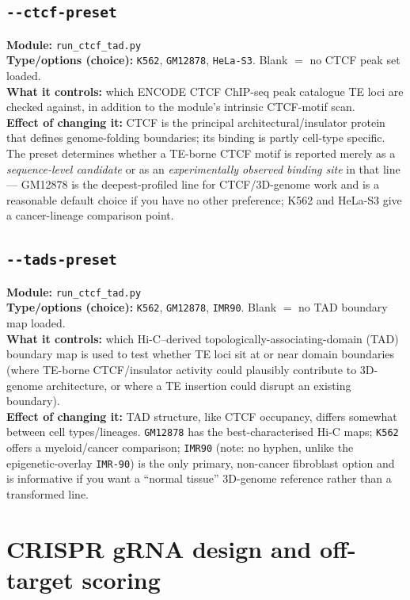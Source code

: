 \documentclass[11pt]{article}
\newcommand{\param}[1]{\subsection*{\texttt{-\/-#1}}}
\begin{document}
\param{ctcf-preset}
\textbf{Module:} \texttt{run\_ctcf\_tad.py}\\
\textbf{Type/options (choice):} \texttt{K562}, \texttt{GM12878}, \texttt{HeLa-S3}.
Blank $=$ no CTCF peak set loaded.\\
\textbf{What it controls:} which ENCODE CTCF ChIP-seq peak catalogue TE loci are
checked against, in addition to the module's intrinsic CTCF-motif scan.\\
\textbf{Effect of changing it:} CTCF is the principal architectural/insulator protein
that defines genome-folding boundaries; its binding is partly cell-type specific. The
preset determines whether a TE-borne CTCF motif is reported merely as a
\emph{sequence-level candidate} or as an \emph{experimentally observed binding site} in
that line — GM12878 is the deepest-profiled line for CTCF/3D-genome work and is a
reasonable default choice if you have no other preference; K562 and HeLa-S3 give a
cancer-lineage comparison point.

\param{tads-preset}
\textbf{Module:} \texttt{run\_ctcf\_tad.py}\\
\textbf{Type/options (choice):} \texttt{K562}, \texttt{GM12878}, \texttt{IMR90}.
Blank $=$ no TAD boundary map loaded.\\
\textbf{What it controls:} which Hi-C–derived topologically-associating-domain (TAD)
boundary map is used to test whether TE loci sit at or near domain boundaries (where
TE-borne CTCF/insulator activity could plausibly contribute to 3D-genome architecture,
or where a TE insertion could disrupt an existing boundary).\\
\textbf{Effect of changing it:} TAD structure, like CTCF occupancy, differs somewhat
between cell types/lineages. \texttt{GM12878} has the best-characterised Hi-C maps;
\texttt{K562} offers a myeloid/cancer comparison; \texttt{IMR90} (note: no hyphen, unlike
the epigenetic-overlay \texttt{IMR-90}) is the only primary, non-cancer fibroblast option
and is informative if you want a ``normal tissue'' 3D-genome reference rather than a
transformed line.

\section{CRISPR gRNA design and off-target scoring}
\end{document}
